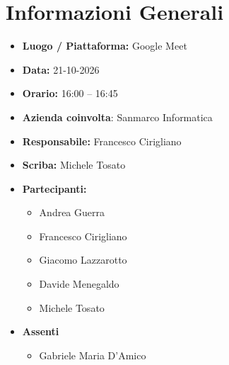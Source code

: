 \documentclass[11pt, a4paper]{article}
\newcommand{\DocDate}{21-10-2026}
\begin{document}
\section{Informazioni Generali}
\begin{itemize}
    \item \textbf{Luogo / Piattaforma:} Google Meet
    \item \textbf{Data:} \DocDate
    \item \textbf{Orario:} 16:00 -- 16:45
    \item \textbf{Azienda coinvolta}: Sanmarco Informatica
    \item \textbf{Responsabile:} Francesco Cirigliano
    \item \textbf{Scriba:} Michele Tosato
    \item \textbf{Partecipanti:}
        \begin{itemize}
            \item Andrea Guerra
            \item Francesco Cirigliano
            \item Giacomo Lazzarotto
            \item Davide Menegaldo
            \item Michele Tosato
        \end{itemize}
        \item \textbf{Assenti}
        \begin{itemize}
        	\item Gabriele Maria D'Amico
        \end{itemize}
\end{itemize}
\clearpage
\end{document}
